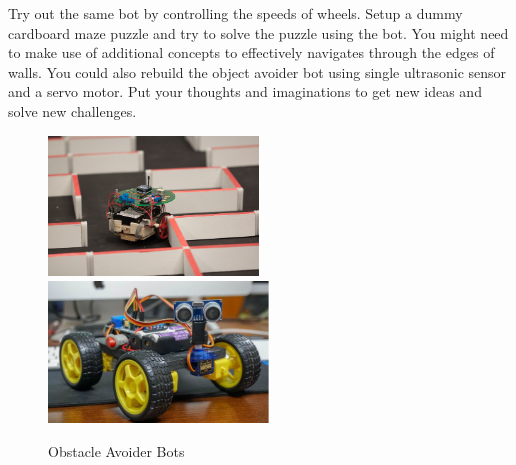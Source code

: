 \vspace{1cm}
Try out the same bot by controlling the speeds of wheels. Setup a dummy cardboard maze puzzle and try to solve the puzzle using the bot. You might need to make use of additional concepts to effectively navigates through the edges of walls. You could also rebuild the object avoider bot using single ultrasonic sensor and a servo motor. Put your thoughts and imaginations to get new ideas and solve new challenges.
\vspace{0.5cm}
\begin{figure}
\begin{multicols}{2}
    \centering
    \includegraphics[width=2.2in]{Chapters/images/ultraSonic_objAvoider_path.png}
    \includegraphics[width=2.3in]{Chapters/images/ultraSonic_end_pic.png}
    \caption{Obstacle Avoider Bots}
\end{multicols}
\end{figure}